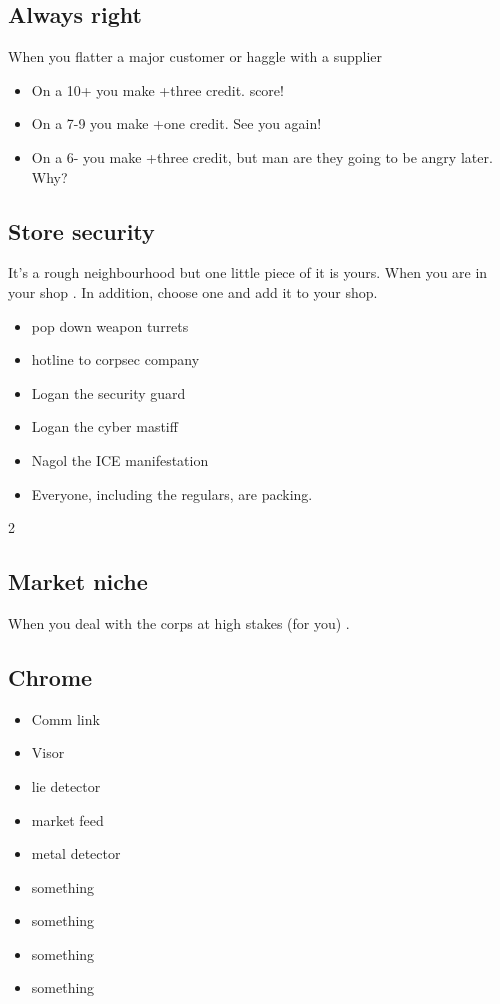 \documentclass{tufte-book}
\begin{document}
\subsection{Always right}
When you flatter a major customer or haggle with a supplier 
\begin{itemize}
\item On a 10+ you make +three credit. score!
\item On a 7-9 you make +one credit. See you again!
\item On a 6- you make +three credit, but man are they going to be angry later. Why?
\end{itemize}

\subsection{Store security}
It's a rough neighbourhood but one little piece of it is yours. When you are in your shop .
In addition, choose one and add it to your shop.
\begin{multicols}{2}
\begin{itemize}
 \item pop down weapon turrets
\item hotline to corpsec company
\item Logan the security guard
\item Logan the cyber mastiff
\item Nagol the ICE manifestation
\item Everyone, including the regulars, are packing.
\end{itemize}
\end{multicols}{2}

\subsection{Market niche}
When you deal with the corps at high stakes (for you) .


\subsection{Chrome}
\begin{multicols}{3}
\begin{itemize}
\item Comm link
\item Visor
\item lie detector
\item market feed
\item metal detector
\item something
\item something
\item something
\item something
\end{itemize}
\end{multicols}
\end{document}

